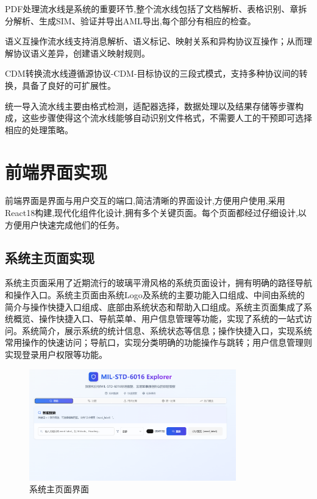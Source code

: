 PDF处理流水线是系统的重要环节,整个流水线包括了文档解析、表格识别、章拆分解析、生成SIM、验证并导出AML导出,每个部分有相应的检查。

语义互操作流水线支持消息解析、语义标记、映射关系和异构协议互操作；从而理解协议语义差异，创建语义映射规则。

CDM转换流水线遵循源协议-CDM-目标协议的三段式模式，支持多种协议间的转换，具备了良好的可扩展性。

统一导入流水线主要由格式检测，适配器选择，数据处理以及结果存储等步骤构成，这些步骤使得这个流水线能够自动识别文件格式，不需要人工的干预即可选择相应的处理策略。


\section{前端界面实现}

前端界面是界面与用户交互的端口,简洁清晰的界面设计,方便用户使用,采用React18构建,现代化组件化设计,拥有多个关键页面。每个页面都经过仔细设计,以方便用户快速完成他们的任务。

\subsection{系统主页面实现}

系统主页面采用了近期流行的玻璃平滑风格的系统页面设计，拥有明确的路径导航和操作入口。系统主页面由系统Logo及系统的主要功能入口组成、中间由系统的简介与操作快捷入口组成、底部由系统状态和帮助入口组成。系统主页面集成了系统概览、操作快捷入口、导航菜单、用户信息管理等功能，实现了系统的一站式访问。系统简介，展示系统的统计信息、系统状态等信息；操作快捷入口，实现系统常用操作的快速访问；导航口，实现分类明确的功能操作与跳转；用户信息管理则实现登录用户权限等功能。

\begin{figure}[H]
\centering
\includegraphics[width=0.8\textwidth]{chapters/fig-0/front-homepage.png}
\caption{系统主页面界面}
\label{fig:frontend-homepage}
\end{figure}

